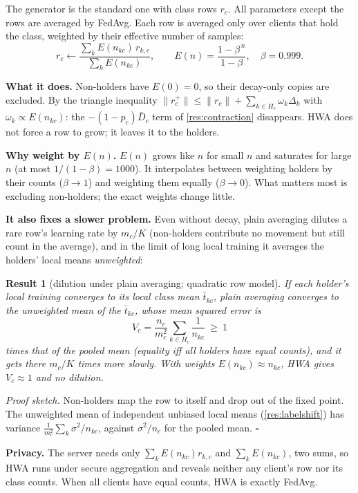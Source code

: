 \documentclass[11pt]{article}
\theoremstyle{plain}
\newtheorem{result}{Result}
\theoremstyle{definition}
\newcommand{\norm}[1]{\lVert #1\rVert}
\begin{document}
\begin{steps}
The generator is the standard one with class rows $r_c$. All parameters except the rows are averaged by FedAvg. Each
row is averaged only over clients that hold the class, weighted by their effective number of samples:
\[
r_c\leftarrow\frac{\sum_kE(n_{kc})\,r_{k,c}}{\sum_kE(n_{kc})},\qquad E(n)=\frac{1-\beta^{\,n}}{1-\beta},\quad\beta=0.999 .
\]
\end{steps}

\textbf{What it does.} Non-holders have $E(0)=0$, so their decay-only copies are excluded. By the triangle inequality
\(\norm{r_c^+}\le\norm{r_c}+\sum_{k\in H_c}\omega_k\Delta_k\) with $\omega_k\propto E(n_{kc})$: the $-(1-p_c)\bar D_c$ term
of \cref{res:contraction} disappears. HWA does not force a row to grow; it leaves it to the holders.

\textbf{Why weight by $E(n)$.} $E(n)$ grows like $n$ for small $n$ and saturates for large $n$ (at most
$1/(1-\beta)=1000$). It interpolates between weighting holders by their counts ($\beta\to1$) and weighting them equally
($\beta\to0$). What matters most is excluding non-holders; the exact weights change little.

\textbf{It also fixes a slower problem.} Even without decay, plain averaging dilutes a rare row's learning rate by
$m_c/K$ (non-holders contribute no movement but still count in the average), and in the limit of long local training
it averages the holders' local means \emph{unweighted}:

\begin{result}[dilution under plain averaging; quadratic row model]\label{res:dilution}
If each holder's local training converges to its local class mean $\bar t_{kc}$, plain averaging converges to the
unweighted mean of the $\bar t_{kc}$, whose mean squared error is
\[
V_c=\frac{n_c}{m_c^2}\sum_{k\in H_c}\frac1{n_{kc}}\ \ge\ 1
\]
times that of the pooled mean (equality iff all holders have equal counts), and it gets there $m_c/K$ times more
slowly. With weights $E(n_{kc})\approx n_{kc}$, HWA gives $V_c\approx1$ and no dilution.
\end{result}
\emph{Proof sketch.} Non-holders map the row to itself and drop out of the fixed point. The unweighted mean of
independent unbiased local means (\cref{res:labelshift}) has variance $\frac1{m_c^2}\sum_k\sigma^2/n_{kc}$, against
$\sigma^2/n_c$ for the pooled mean. $\square$

\textbf{Privacy.} The server needs only $\sum_kE(n_{kc})r_{k,c}$ and $\sum_kE(n_{kc})$, two sums, so HWA runs under
secure aggregation and reveals neither any client's row nor its class counts. When all clients have equal counts,
HWA is exactly FedAvg.
\end{document}

